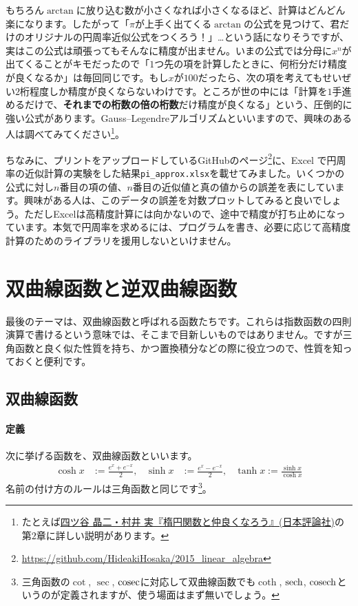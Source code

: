 もちろん$\arctan$に放り込む数が小さくなれば小さくなるほど、計算はどんどん楽になります。したがって「$\pi$が上手く出てくる$\arctan$の公式を見つけて、君だけのオリジナルの円周率近似公式をつくろう！」…という話になりそうですが、実はこの公式は頑張ってもそんなに精度が出ません。いまの公式では分母に$x^n$が出てくることがキモだったので「$1$つ先の項を計算したときに、何桁分だけ精度が良くなるか」は毎回同じです。もし$x$が$100$だったら、次の項を考えてもせいぜい$2$桁程度しか精度が良くならないわけです。ところが世の中には「計算を$1$手進めるだけで、\textbf{それまでの桁数の倍の桁数}だけ精度が良くなる」という、圧倒的に強い公式があります。Gauss--Legendreアルゴリズムといいますので、興味のある人は調べてみてください\footnote{たとえば\href{http://www.nippyo.co.jp/book/6387.html}{四ツ谷 晶二・村井 実『楕円関数と仲良くなろう』(日本評論社)}の第$2$章に詳しい説明があります。}。

ちなみに、プリントをアップロードしているGitHubのページ\footnote{\url{https://github.com/HideakiHosaka/2015_linear_algebra}}に、Excel で円周率の近似計算の実験をした結果\texttt{pi\_approx.xlsx}を載せてみました。いくつかの公式に対し$n$番目の項の値、$n$番目の近似値と真の値からの誤差を表にしています。興味がある人は、このデータの誤差を対数プロットしてみると良いでしょう。ただしExcelは高精度計算には向かないので、途中で精度が打ち止めになっています。本気で円周率を求めるには、プログラムを書き、必要に応じて高精度計算のためのライブラリを援用しないといけません。

\section{双曲線函数と逆双曲線函数}

最後のテーマは、双曲線函数と呼ばれる函数たちです。これらは指数函数の四則演算で書けるという意味では、そこまで目新しいものではありません。ですが三角函数と良く似た性質を持ち、かつ置換積分などの際に役立つので、性質を知っておくと便利です。

\subsection{双曲線函数}

\paragraph{定義}
次に挙げる函数を、双曲線函数といいます。
\begin{align*}
\cosh x &:= \frac{e^x+e^{-x}}{2}, & \sinh x &:= \frac{e^x - e^{-x}}{2}, & \tanh x := \frac{\sinh x}{\cosh x}
\end{align*}
名前の付け方のルールは三角函数と同じです\footnote{三角函数の$\cot$, $\sec$, $\operatorname{cosec}$に対応して双曲線函数でも$\coth$, $\operatorname{sech}$, $\operatorname{cosech}$というのが定義されますが、使う場面はまず無いでしょう。}。

